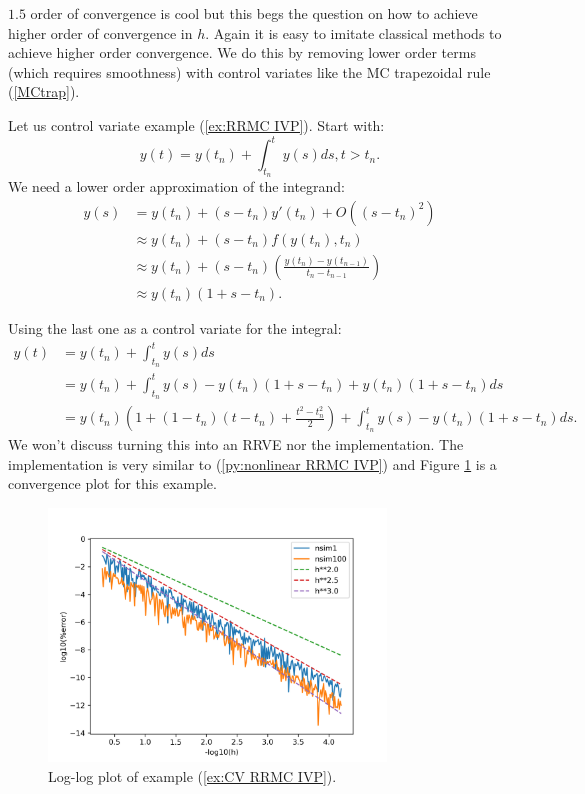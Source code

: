 \documentclass[a4paper,12pt]{article}
\begin{document}
$1.5$ order of convergence is cool but this begs the question on how to achieve
higher order of convergence in $h$. Again it is easy to imitate classical methods
to achieve higher order convergence. We do this by removing lower order terms (which requires
smoothness) with control variates like the MC trapezoidal rule (\ref{MCtrap}).

\begin{example}[CV RRMC $y'=y$]\label{ex:CV RRMC IVP}
    Let us control variate example (\ref{ex:RRMC IVP}). Start
    with:
    \begin{equation}
        y(t)= y(t_{n}) + \int_{t_{n}}^{t}y(s)ds , t>t_{n}.
    \end{equation}
    We need a lower order approximation of the integrand:
    \begin{align}
        y(s) & = y(t_{n}) + (s-t_{n})y'(t_{n}) + O((s-t_{n})^{2})       \\
             & \approx y(t_{n}) + (s-t_{n})f(y(t_{n}),t_{n})            \\
             & \approx y(t_{n}) +
        (s-t_{n})\left(\frac{y(t_{n})-y(t_{n-1})}{t_{n}-t_{n-1}}\right) \\
             & \approx y(t_{n})(1+s-t_{n}).
    \end{align}

    Using the last one as a control variate for the integral:
    \begin{align}
        y(t) & = y(t_{n}) + \int_{t_{n}}^{t}y(s)ds                                          \\
             & = y(t_{n}) + \int_{t_{n}}^{t}y(s)-y(t_{n})(1+s-t_{n}) +y(t_{n})(1+s-t_{n})ds \\
             & = y(t_{n})\left(1 + (1-t_{n})(t-t_{n})+\frac{t^{2}-t_{n}^{2}}{2}\right)
        + \int_{t_{n}}^{t}y(s)-y(t_{n})(1+s-t_{n})ds.
    \end{align}
    We won't discuss turning this into an RRVE nor the implementation. The implementation
    is very similar to (\ref{py:nonlinear RRMC IVP}) and
    Figure \ref{fig:CV RRMC IVP} is a convergence plot for this example.

    \begin{figure}[h!]
        \centering
        \includegraphics[width=0.8\textwidth]{plots/CV RRMC IVP.png}
        \caption{Log-log plot of example (\ref{ex:CV RRMC IVP}).}
        \label{fig:CV RRMC IVP}
    \end{figure}
\end{example}
\end{document}
